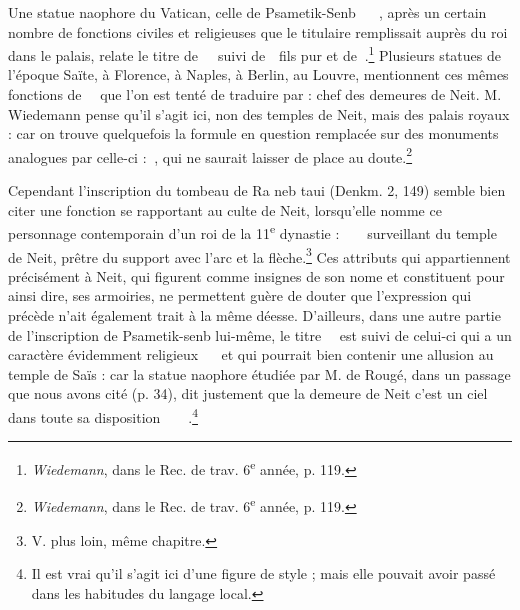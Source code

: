 \documentclass[letterpaper,twocolumn,openany,nodeprecatedcode]{dndbook}
\newcommand*\hieroAAAH{}
\newcommand*\hieroAAAI{}
\newcommand*\hieroAAAO{}
\newcommand*\hieroAAAQ{}
\newcommand*\hieroAABR{}
\newcommand*\hieroAACM{}
\newcommand*\hieroAACN{\raisebox{1ex}{}}
\newcommand*\hieroAACS{}
\newcommand*\hieroAADY{\raisebox{0.3ex}{}}
\newcommand*\hieroAAHA{}
\newcommand*\hieroAAHC{}
\newcommand*\hieroAAHK{}
\newcommand*\hieroAAHR{}
\newcommand*\hieroAAHS{}
\newcommand*\hieroAAHZ{}
\newcommand*\hieroAALJ{}
\newcommand*\hieroAAOH{\raisebox{0.3ex}{}}
\newcommand*\hieroAAOR{}
\newcommand*\hieroAAOX{}
\newcommand*\hieroAAPB{}
\newcommand*\hieroAAPC{\raisebox{0.5ex}{}}
\newcommand*\hieroAAPH{}
\newcommand*\hieroAAQA{}
\newcommand*\hieroAAQB{}
\newcommand*\hieroAAQC{}
\newcommand*\hieroAAQD{}
\newcommand*\hieroAAQE{}
\newcommand*\hieroAAQF{}
\newcommand*\hieroAAQG{}
\newcommand*\hieroAAQH{}
\newcommand*\hieroAAQI{}
\begin{document}
Une statue naophore du Vatican, celle de Psametik-Senb $\hieroAAAH\:\hieroAAQA\:\hieroAAQB\allowbreak\:\hieroAACM\:\hieroAALJ\allowbreak\:\hieroAAAQ\:\hieroAAAO$, après un certain nombre de fonctions civiles et religieuses que le titulaire remplissait auprès du roi dans le palais, relate le titre de $\hieroAAOR\:\hieroAAHA\allowbreak\:\hieroAAOH\:\hieroAAQC$ suivi de $\hieroAAAI\:\hieroAADY$ fils pur et de $\hieroAAOX\:\hieroAAQD$.\footnote{\emph{Wiedemann}, dans le Rec. de trav. 6\textsuperscript{e} année, p. 119.} Plusieurs statues de l'époque Saïte, à Florence, à Naples, à Berlin, au Louvre, mentionnent ces mêmes fonctions de $\hieroAAOR\:\hieroAAHA\allowbreak\:\hieroAAAQ\:\hieroAAQC$ que l'on est tenté de traduire par : chef des demeures de Neit. M. Wiedemann pense qu'il s'agit ici, non des temples de Neit, mais des palais royaux : car on trouve quelquefois la formule en question remplacée sur des monuments analogues par celle-ci : $\hieroAAQE\:\hieroAAQC$, qui ne saurait laisser de place au doute.\footnote{\emph{Wiedemann}, dans le Rec. de trav. 6\textsuperscript{e} année, p. 119.}

Cependant l'inscription du tombeau de Ra neb taui (Denkm. 2, 149) semble bien citer une fonction se rapportant au culte de Neit, lorsqu'elle nomme ce personnage contemporain d'un roi de la 11\textsuperscript{e} dynastie : $\hieroAAQI\:\hieroAAHA\:\hieroAAQC\allowbreak\:\hieroAAHC\:\hieroAAQF\allowbreak\:\hieroAABR\:\hieroAAQG$ surveillant du temple de Neit, prêtre du support avec l'arc et la flèche.\footnote{V. plus loin, même chapitre.} Ces attributs qui appartiennent précisément à Neit, qui figurent comme insignes de son nome et constituent pour ainsi dire, ses armoiries, ne permettent guère de douter que l'expression qui précède n'ait également trait à la même déesse. D'ailleurs, dans une autre partie de l'inscription de Psametik-senb lui-même, le titre $\hieroAAOR\:\hieroAAHA\allowbreak\:\hieroAAAQ\:\hieroAAQC$ est suivi de celui-ci qui a un caractère évidemment religieux $\hieroAAPB\:\hieroAACS\:\hieroAAQH\allowbreak\:\hieroAACN\:\hieroAAPH$ et qui pourrait bien contenir une allusion au temple de Saïs : car la statue naophore étudiée par M. de Rougé, dans un passage que nous avons cité (p. 34), dit justement que la demeure de Neit c'est un ciel dans toute sa disposition $\hieroAAAO\:\hieroAAHK\:\hieroAAPC\allowbreak\:\hieroAAHZ\:\hieroAABR\:\hieroAACS\allowbreak\:\hieroAAHR\:\hieroAAHS$.\footnote{Il est vrai qu'il s'agit ici d'une figure de style ; mais elle pouvait avoir passé dans les habitudes du langage local.}
\end{document}
